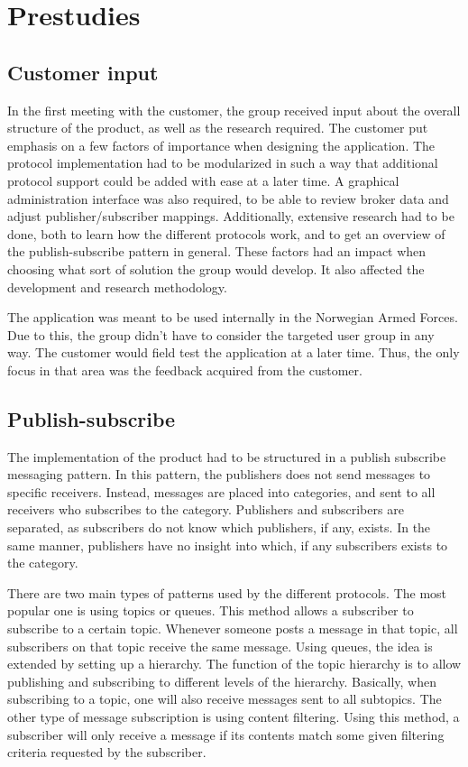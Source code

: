 
\chapter{Prestudies}

\section{Customer input}

In the first meeting with the customer, the group received input about the overall structure of the product, as well as the research required. The customer put emphasis on a few factors of importance when designing the application. The protocol implementation had to be modularized in such a way that additional protocol support could be added with ease at a later time. A graphical administration interface was also required, to be able to review broker data and adjust publisher/subscriber mappings. Additionally, extensive research had to be done, both to learn how the different protocols work, and to get an overview of the publish-subscribe pattern in general. These factors had an impact when choosing what sort of solution the group would develop. It also affected the development and research methodology.

The application was meant to be used internally in the Norwegian Armed Forces. Due to this, the group didn't have to consider the targeted user group in any way. The customer would field test the application at a later time. Thus, the only focus in that area was the feedback acquired from the customer.

\section{Publish-subscribe}

The implementation of the product had to be structured in a publish subscribe messaging pattern. In this pattern, the publishers does not send messages to specific receivers. Instead, messages are placed into categories, and sent to all receivers who subscribes to the category. Publishers and subscribers are separated, as subscribers do not know which publishers, if any, exists. In the same manner, publishers have no insight into which, if any subscribers exists to the category.

There are two main types of patterns used by the different protocols. The most popular one is using topics or queues. This method allows a subscriber to subscribe to a certain topic. Whenever someone posts a message in that topic, all subscribers on that topic receive the same message. Using queues, the idea is extended by setting up a hierarchy. The function of the topic hierarchy is to allow publishing and subscribing to different levels of the hierarchy. Basically, when subscribing to a topic, one will also receive messages sent to all subtopics. The other type of message subscription is using content filtering. Using this method, a subscriber will only receive a message if its contents match some given filtering criteria requested by the subscriber.

